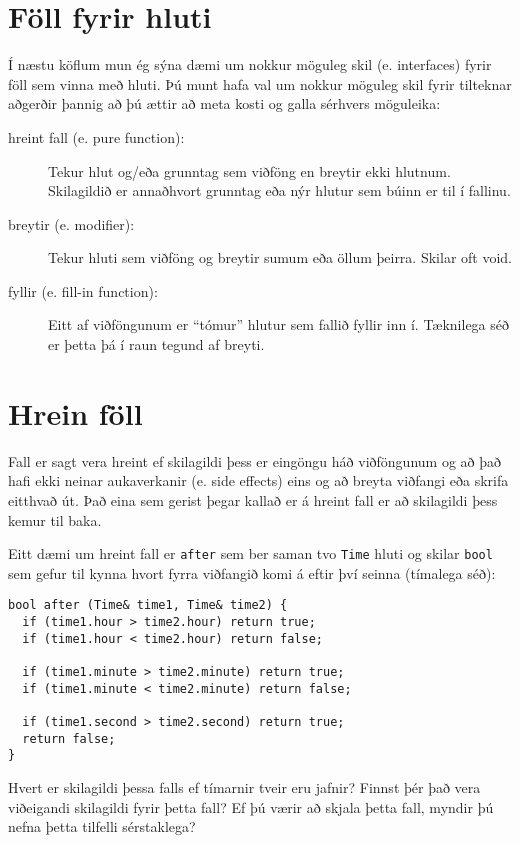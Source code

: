 \section{Föll fyrir hluti}
\label{objectops}

Í næstu köflum mun ég sýna dæmi um nokkur möguleg skil (e. interfaces) fyrir föll sem vinna með hluti.
Þú munt hafa val um nokkur möguleg skil fyrir tilteknar aðgerðir þannig að þú ættir að meta kosti og galla sérhvers möguleika:

\begin{description}

\item[hreint fall (e. pure function):]  Tekur hlut og/eða grunntag sem viðföng en breytir ekki hlutnum.
Skilagildið er annaðhvort grunntag eða nýr hlutur sem búinn er til í fallinu. 

\item[breytir (e. modifier):]  Tekur hluti sem viðföng og breytir sumum eða öllum þeirra.  Skilar oft void. 

\item[fyllir (e. fill-in function):]  Eitt af viðföngunum er ``tómur'' hlutur sem fallið fyllir inn í.
Tæknilega séð er þetta þá í raun tegund af breyti. 

\end{description}

\section{Hrein föll}

Fall er sagt vera hreint ef skilagildi þess er eingöngu háð viðföngunum og að það hafi ekki neinar aukaverkanir (e. side effects)
eins og að breyta viðfangi eða skrifa eitthvað út.
Það eina sem gerist þegar kallað er á hreint fall er að skilagildi þess kemur til baka.

Eitt dæmi um hreint fall er {\tt after} sem ber saman tvo {\tt Time} hluti og skilar {\tt bool} sem gefur til kynna hvort fyrra viðfangið komi á eftir því seinna (tímalega séð):

\begin{verbatim}
bool after (Time& time1, Time& time2) {
  if (time1.hour > time2.hour) return true;
  if (time1.hour < time2.hour) return false;

  if (time1.minute > time2.minute) return true;
  if (time1.minute < time2.minute) return false;

  if (time1.second > time2.second) return true;
  return false;
}
\end{verbatim}
%
Hvert er skilagildi þessa falls ef tímarnir tveir eru jafnir?
Finnst þér það vera viðeigandi skilagildi fyrir þetta fall?
Ef þú værir að skjala þetta fall, myndir þú nefna þetta tilfelli sérstaklega?

